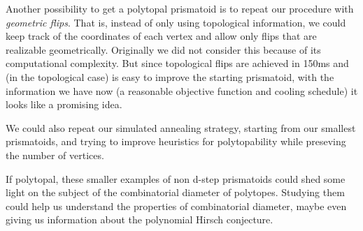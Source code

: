 \documentclass[12pt,a4paper]{article}
\theoremstyle{plain}
\theoremstyle{definition}
\begin{document}
Another possibility to get a polytopal prismatoid is to repeat our procedure with \emph{geometric flips}. That is, instead of only using topological information, we could keep track of the coordinates of each vertex and allow only flips that are realizable geometrically. Originally we did not consider this because of its computational complexity. But since topological flips are achieved in 150ms and (in the topological case) is easy to improve the starting prismatoid, with the information we have now (a reasonable objective function and cooling schedule) it looks like a promising idea.

We could also repeat our simulated annealing strategy, starting from our smallest prismatoids, and trying to improve heuristics for polytopability while preseving the number of vertices.

If polytopal, these smaller examples of non d-step prismatoids could shed some light on the subject of the combinatorial diameter of polytopes. Studying them could help us understand the properties of combinatorial diameter, maybe even giving us information about the polynomial Hirsch conjecture.
\end{document}
